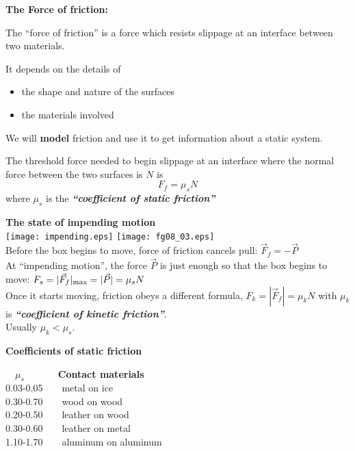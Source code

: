 \documentclass{seminar}
\begin{document}
\begin{slide}

{\bf \blue The Force of friction:}

The ``force of friction'' is a force which resists slippage
at an interface between two materials.

It depends on the details of 
\begin{itemize}
\item{}the shape and nature of the surfaces
\item{}the materials involved
\end{itemize}

We will {\bf model} friction and use it to get information
about a static system.


The threshold force needed to begin slippage at an interface where
the normal force between the two surfaces is $N$ is
$$
F_f= \mu_s N
$$
where $\mu_s$ is the {\bf\it ``coefficient of static friction''}


\vfill
\end{slide}





\begin{slide}
{\bf\blue The state of impending motion}\\
\texttt{[image: impending.eps]}
\texttt{[image: fg08\_03.eps]}\\
Before the box begins to move, force of friction cancels pull: 
$\vec F_f=-\vec P$\\
At ``impending motion'', the force $\vec P$ is just enough so that the box 
begins to move: $F_s=|\vec F_f|_{\rm max}=|\vec P|=\mu_s N$\\
Once it starts moving, friction obeys a different formula,
$F_k=|\vec F_f|=\mu_k N$ with $\mu_k$ is {\bf\it ``coefficient of kinetic friction''}.\\
Usually $\mu_k<\mu_s$. 
\vfill\end{slide}



\begin{slide}
{\bf\blue Coefficients of static friction}

\vskip 1cm

~~$\mu_s$~~~~~~~{\bf Contact materials}\\
0.03-0.05~~~~metal on ice \\
0.30-0.70~~~~wood on wood\\
0.20-0.50~~~~leather on wood\\
0.30-0.60~~~~leather on metal\\
1.10-1.70~~~~aluminum on aluminum\\
\vfill
\end{slide}
\end{document}
